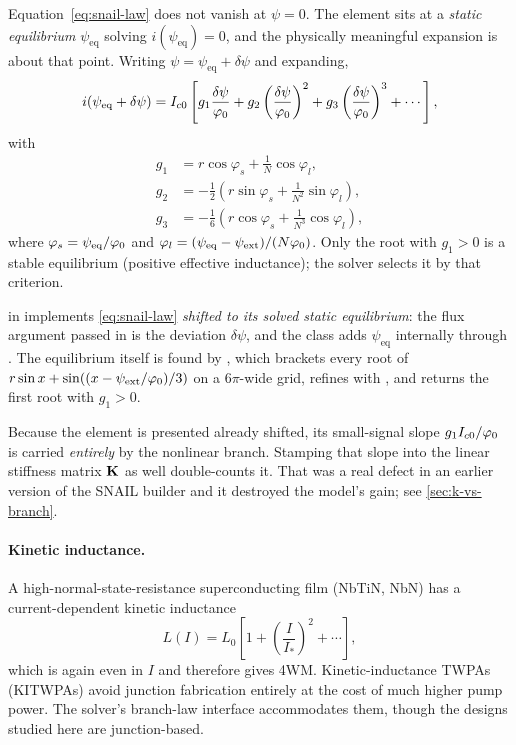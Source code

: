 Equation~\eqref{eq:snail-law} does not vanish at $\psi=0$. The element sits at a
\emph{static equilibrium} $\psi_{\mathrm{eq}}$ solving $i(\psi_{\mathrm{eq}})=0$,
and the physically meaningful expansion is about that point. Writing
$\psi = \psi_{\mathrm{eq}} + \delta\psi$ and expanding,
\begin{equation}
  i(\psi_{\mathrm{eq}} + \delta\psi)
  = I_{c0}\left[
      g_1 \frac{\delta\psi}{\varphi_{0}}
    + g_2 \left(\frac{\delta\psi}{\varphi_{0}}\right)^{2}
    + g_3 \left(\frac{\delta\psi}{\varphi_{0}}\right)^{3}
    + \cdots \right],
\end{equation}
with
\begin{align}
  g_1 &= r\cos\varphi_s + \tfrac{1}{N}\cos\varphi_l, \\
  g_2 &= -\tfrac{1}{2}\!\left(r\sin\varphi_s + \tfrac{1}{N^{2}}\sin\varphi_l\right), \\
  g_3 &= -\tfrac{1}{6}\!\left(r\cos\varphi_s + \tfrac{1}{N^{3}}\cos\varphi_l\right),
\end{align}
where $\varphi_s = \psi_{\mathrm{eq}}/\varphi_{0}$ and
$\varphi_l = (\psi_{\mathrm{eq}}-\psi_{\mathrm{ext}})/(N\varphi_{0})$. Only the root
with $g_1>0$ is a stable equilibrium (positive effective inductance); the
solver selects it by that criterion.

\begin{implnote}
 in  implements
\eqref{eq:snail-law} \emph{shifted to its solved static equilibrium}: the flux
argument passed in is the deviation $\delta\psi$, and the class adds
$\psi_{\mathrm{eq}}$ internally through . The equilibrium
itself is found by , which brackets every root
of $r\sin x + \sin((x-\psi_{\mathrm{ext}}/\varphi_{0})/3)$ on a
$6\pi$-wide grid, refines with , and returns the first root with
$g_1>0$.

Because the element is presented already shifted, its small-signal slope
$g_1 I_{c0}/\varphi_{0}$ is carried \emph{entirely} by the nonlinear branch. Stamping
that slope into the linear stiffness matrix $\mathbf{K}$ as well double-counts it.
That was a real defect in an earlier version of the SNAIL builder and it
destroyed the model's gain; see \cref{sec:k-vs-branch}.
\end{implnote}

\paragraph{Kinetic inductance.} A high-normal-state-resistance superconducting
film (NbTiN, NbN) has a current-dependent kinetic inductance
\begin{equation}
  L(I) = L_0\left[1 + \left(\frac{I}{I_*}\right)^{2} + \cdots\right],
\end{equation}
which is again even in $I$ and therefore gives 4WM. Kinetic-inductance TWPAs
(KITWPAs) avoid junction fabrication entirely at the cost of much higher pump
power. The solver's branch-law interface accommodates them, though the designs
studied here are junction-based.

